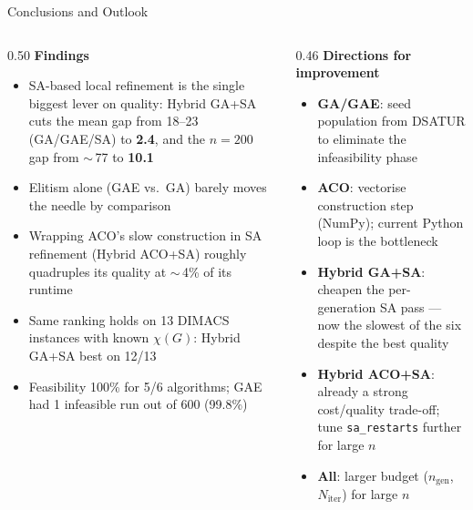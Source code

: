 \documentclass[aspectratio=169,10pt]{beamer}
\begin{document}
\begin{frame}{Conclusions and Outlook}

\begin{columns}[T]
\begin{column}{0.50\textwidth}
\textbf{Findings}
\footnotesize
\begin{itemize}
  \item SA-based local refinement is the single biggest lever on quality: Hybrid GA+SA cuts the mean gap from 18–23 (GA/GAE/SA) to \textbf{2.4}, and the $n{=}200$ gap from $\sim$\,77 to \textbf{10.1}
  \item Elitism alone (GAE vs.\ GA) barely moves the needle by comparison
  \item Wrapping ACO's slow construction in SA refinement (Hybrid ACO+SA) roughly quadruples its quality at $\sim$\,4\% of its runtime
  \item Same ranking holds on 13 DIMACS instances with known $\chi(G)$: Hybrid GA+SA best on 12/13
  \item Feasibility 100\% for 5/6 algorithms; GAE had 1 infeasible run out of 600 (99.8\%)
\end{itemize}
\normalsize
\end{column}

\begin{column}{0.46\textwidth}
\textbf{Directions for improvement}
\footnotesize
\begin{itemize}
  \item \textbf{GA/GAE}: seed population from DSATUR to eliminate the infeasibility phase
  \item \textbf{ACO}: vectorise construction step (NumPy); current Python loop is the bottleneck
  \item \textbf{Hybrid GA+SA}: cheapen the per-generation SA pass — now the slowest of the six despite the best quality
  \item \textbf{Hybrid ACO+SA}: already a strong cost/quality trade-off; tune \texttt{sa\_restarts} further for large $n$
  \item \textbf{All}: larger budget ($n_{\text{gen}}$, $N_{\text{iter}}$) for large $n$
\end{itemize}
\normalsize
\end{column}
\end{columns}

\vspace{0.3em}
\begin{center}
\end{center}

\end{frame}
\end{document}
